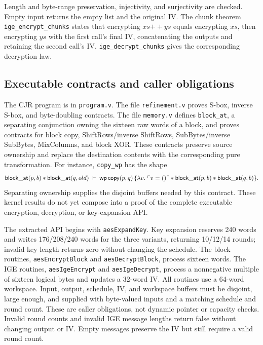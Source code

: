 Length and byte-range preservation, injectivity, and surjectivity are checked.
Empty input returns the empty list and the original IV. The chunk theorem
\texttt{ige\_encrypt\_chunks} states that encrypting \(xs\mathbin{+\!+}ys\)
equals encrypting \(xs\), then encrypting \(ys\) with the first call's final
IV, concatenating the outputs and retaining the second call's IV.
\texttt{ige\_decrypt\_chunks} gives the corresponding decryption law.

\subsection{Executable contracts and caller obligations}

The CJR program is in \texttt{program.v}. The file \texttt{refinement.v}
proves S-box, inverse S-box, and byte-doubling contracts.
The file \texttt{memory.v} defines \texttt{block\_at}, a separating
conjunction owning the sixteen raw words of a block, and proves contracts
for block copy, ShiftRows/inverse ShiftRows, SubBytes/inverse SubBytes,
MixColumns, and block XOR. These contracts preserve source ownership and
replace the destination contents with the corresponding pure transformation.
For instance, \texttt{copy\_wp} has the shape
\[
 \mathsf{block\_at}(p,b)\mathbin{*}\mathsf{block\_at}(q,old)
 \;\vdash\;
 \mathsf{wp}\,\mathsf{copy}(p,q)\,
 \{\lambda v.\;\ulcorner v=\mathsf{()} \urcorner\mathbin{*}
   \mathsf{block\_at}(p,b)\mathbin{*}\mathsf{block\_at}(q,b)\}.
\]
Separating ownership supplies the disjoint buffers needed by this contract.
These kernel results do not yet compose into a proof of the complete
executable encryption, decryption, or key-expansion API.

The extracted API begins with \texttt{aesExpandKey}. Key expansion reserves
240 words and writes
176/208/240 words for the three variants, returning 10/12/14 rounds;
invalid key length returns zero without changing the schedule.
The block routines, \texttt{aesEncryptBlock} and \texttt{aesDecryptBlock},
process sixteen words. The IGE routines, \texttt{aesIgeEncrypt} and
\texttt{aesIgeDecrypt}, process a nonnegative multiple of
sixteen logical bytes and updates a 32-word IV. All routines use a 64-word
workspace. Input, output, schedule, IV, and workspace buffers must be
disjoint, large enough, and supplied with byte-valued inputs and a matching
schedule and round count. These are caller obligations, not dynamic pointer
or capacity checks. Invalid round counts and invalid IGE message lengths
return false without changing output or IV. Empty messages preserve the IV
but still require a valid round count.

